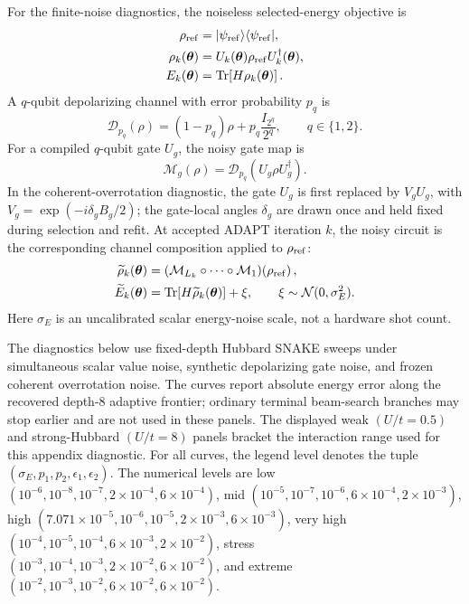 \documentclass[
  reprint,
  amsmath,
  amssymb,
  aps,
  pra,
  nofootinbib,
  superscriptaddress,
  floatfix
]{revtex4-2}
\newcommand{\ket}[1]{|#1\rangle}
\newcommand{\bra}[1]{\langle #1|}
\begin{document}
For the finite-noise diagnostics, the noiseless selected-energy objective is
\begin{equation}
\begin{aligned}
\rho_{\rm ref}
&=\ket{\psi_{\rm ref}}\bra{\psi_{\rm ref}},
\\
\rho_k(\boldsymbol{\theta})
&=U_k(\boldsymbol{\theta})\rho_{\rm ref}U_k^\dagger(\boldsymbol{\theta}),
\\
E_k(\boldsymbol{\theta})
&=\operatorname{Tr}\!\left[H\rho_k(\boldsymbol{\theta})\right].
\end{aligned}
\end{equation}
A \(q\)-qubit depolarizing channel with error probability \(p_q\) is
\begin{equation}
\mathcal D_{p_q}(\rho)
=(1-p_q)\rho+p_q\frac{I_{2^q}}{2^q},
\qquad
q\in\{1,2\}.
\end{equation}
For a compiled \(q\)-qubit gate \(U_g\), the noisy gate map is
\begin{equation}
\mathcal M_g(\rho)
=
\mathcal D_{p_q}\!\left(U_g\rho U_g^\dagger\right).
\end{equation}
In the coherent-overrotation diagnostic, the gate \(U_g\) is first replaced by
\(V_gU_g\), with \(V_g=\exp(-i\delta_gB_g/2)\); the gate-local angles
\(\delta_g\) are drawn once and held fixed during selection and refit.
At accepted ADAPT iteration \(k\), the noisy circuit is the corresponding
channel composition applied to \(\rho_{\rm ref}\):
\begin{equation}
\begin{aligned}
\widetilde\rho_k(\boldsymbol{\theta})
&=
\left(\mathcal M_{L_k}\circ\cdots\circ\mathcal M_1\right)
\!\left(\rho_{\rm ref}\right),
\\
\widetilde E_k(\boldsymbol{\theta})
&=
\operatorname{Tr}\!\left[
H\widetilde\rho_k(\boldsymbol{\theta})
\right]
+\xi,
\qquad
\xi\sim\mathcal N(0,\sigma_E^2).
\end{aligned}
\end{equation}
Here \(\sigma_E\) is an uncalibrated scalar energy-noise scale, not a
hardware shot count.

The diagnostics below use fixed-depth Hubbard SNAKE sweeps under simultaneous scalar value noise, synthetic depolarizing gate noise, and frozen coherent overrotation noise.  The curves report absolute energy error along the recovered depth-8 adaptive frontier; ordinary terminal beam-search branches may stop earlier and are not used in these panels.  The displayed weak \((U/t=0.5)\) and strong-Hubbard \((U/t=8)\) panels bracket the interaction range used for this appendix diagnostic.  For all curves, the legend level denotes the tuple \((\sigma_E,p_1,p_2,\epsilon_1,\epsilon_2)\).  The numerical levels are low \((10^{-6},10^{-8},10^{-7},2\times10^{-4},6\times10^{-4})\), mid \((10^{-5},10^{-7},10^{-6},6\times10^{-4},2\times10^{-3})\), high \((7.071\times10^{-5},10^{-6},10^{-5},2\times10^{-3},6\times10^{-3})\), very high \((10^{-4},10^{-5},10^{-4},6\times10^{-3},2\times10^{-2})\), stress \((10^{-3},10^{-4},10^{-3},2\times10^{-2},6\times10^{-2})\), and extreme \((10^{-2},10^{-3},10^{-2},6\times10^{-2},6\times10^{-2})\).
\end{document}
